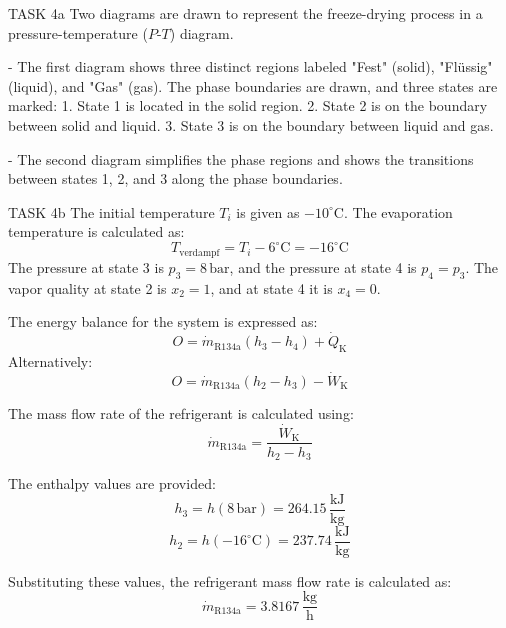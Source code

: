 TASK 4a  
Two diagrams are drawn to represent the freeze-drying process in a pressure-temperature (\(P\)-\(T\)) diagram.  

- The first diagram shows three distinct regions labeled "Fest" (solid), "Flüssig" (liquid), and "Gas" (gas). The phase boundaries are drawn, and three states are marked:  
  1. State 1 is located in the solid region.  
  2. State 2 is on the boundary between solid and liquid.  
  3. State 3 is on the boundary between liquid and gas.  

- The second diagram simplifies the phase regions and shows the transitions between states 1, 2, and 3 along the phase boundaries.  

TASK 4b  
The initial temperature \(T_i\) is given as \(-10^\circ\text{C}\). The evaporation temperature is calculated as:  
\[
T_{\text{verdampf}} = T_i - 6^\circ\text{C} = -16^\circ\text{C}
\]  
The pressure at state 3 is \(p_3 = 8 \, \text{bar}\), and the pressure at state 4 is \(p_4 = p_3\). The vapor quality at state 2 is \(x_2 = 1\), and at state 4 it is \(x_4 = 0\).  

The energy balance for the system is expressed as:  
\[
O = \dot{m}_{\text{R134a}} (h_3 - h_4) + \dot{Q}_{\text{K}}
\]  
Alternatively:  
\[
O = \dot{m}_{\text{R134a}} (h_2 - h_3) - \dot{W}_{\text{K}}
\]  

The mass flow rate of the refrigerant is calculated using:  
\[
\dot{m}_{\text{R134a}} = \frac{\dot{W}_{\text{K}}}{h_2 - h_3}
\]  

The enthalpy values are provided:  
\[
h_3 = h(8 \, \text{bar}) = 264.15 \, \frac{\text{kJ}}{\text{kg}}
\]  
\[
h_2 = h(-16^\circ\text{C}) = 237.74 \, \frac{\text{kJ}}{\text{kg}}
\]  

Substituting these values, the refrigerant mass flow rate is calculated as:  
\[
\dot{m}_{\text{R134a}} = 3.8167 \, \frac{\text{kg}}{\text{h}}
\]  